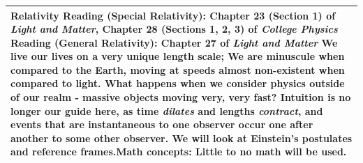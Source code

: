 \documentclass[12pt]{article}
\begin{document}
\noindent \begin{tabularx}{\textwidth}[c]{| X |}
\hline
	\textbf{Relativity} \newline Reading (Special Relativity): Chapter 23 (Section 1) of \textit{Light and Matter}, Chapter 28 (Sections 1, 2, 3) of \textit{College Physics} \newline Reading (General Relativity): Chapter 27 of \textit{Light and Matter} \newline We live our lives on a very unique length scale; We are minuscule when compared to the Earth, moving at speeds almost non-existent when compared to light. What happens when we consider physics outside of our realm - massive objects moving very, very fast? Intuition is no longer our guide here, as time \textit{dilates} and lengths \textit{contract}, and events that are instantaneous to one observer occur one after another to some other observer. We will look at Einstein's postulates and reference frames.\newline Math concepts: Little to no math will be used.\\ \hline
\end{tabularx}
\end{document}
